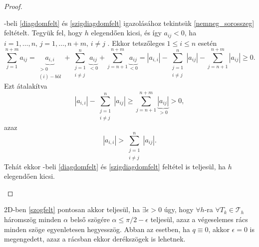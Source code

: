 \begin{proof}
\begin{enumerate}[label=(\roman*)]
			-beli \ref{diagdomfelt} és \ref{szigdiagdomfelt} igazolásához tekintsük \ref{nemneg_sorosszeg} feltételt. Tegyük fel, hogy $h$ elegendően kicsi, és így $a_{ij} < 0$, ha $i = 1, \ldots, n, \, j = 1, \ldots, n+m, \, i \neq j$ . Ekkor tetszőleges $1 \leq i \leq n$ esetén
			\begin{equation*}
				\sum_{j = 1}^{n+m} a_{ij} = \underbrace{a_{i,i}}_{\substack {>0 \\ (i)-ből}} + \sum_{\substack {j = 1 \\ i \neq j}}^{n} \underbrace{a_{ij}}_{<0} + \sum_{j = n+1}^{n+m} \underbrace{a_{ij}}_{<0} = |a_{i,i}| - \sum_{\substack {j = 1 \\ i \neq j}}^{n} |a_{ij}| - \sum_{j = n+1}^{n+m} |a_{ij}| \geq 0.
			\end{equation*}
			Ezt átalakítva
			\begin{equation*}
				|a_{i,i}| - \sum_{\substack {j = 1 \\ i \neq j}}^{n} |a_{ij}| \geq \sum_{j = n+1}^{n+m} \underbrace{|a_{ij}|}_{> 0} > 0,
			\end{equation*}
			azaz 
			\begin{equation*}
				|a_{i,i}| > \sum_{\substack {j = 1 \\ i \neq j}}^{n} |a_{ij}|.
			\end{equation*}
			Tehát ekkor -beli   \ref{diagdomfelt} és  \ref{szigdiagdomfelt} feltétel is teljesül, ha $h$ elegendően kicsi.
	\end{enumerate}
\end{proof}

\begin{remark}\label{2dszogfelt}
	2D-ben \eqref{szogfelt} pontosan akkor teljesül, ha $\exists \epsilon > 0$ úgy, hogy $\forall h$-ra $\forall T_k \in \mathcal{T}_h$ háromszög minden $\alpha$ belső szögére $\alpha \leq \pi / 2 - \epsilon$ teljesül, azaz a végeselemes rács minden szöge egyenletesen hegyesszög. Abban az esetben, ha $q \equiv 0$, akkor $\epsilon = 0$ is megengedett, azaz a rácsban ekkor derékszögek is lehetnek.
\end{remark}		


